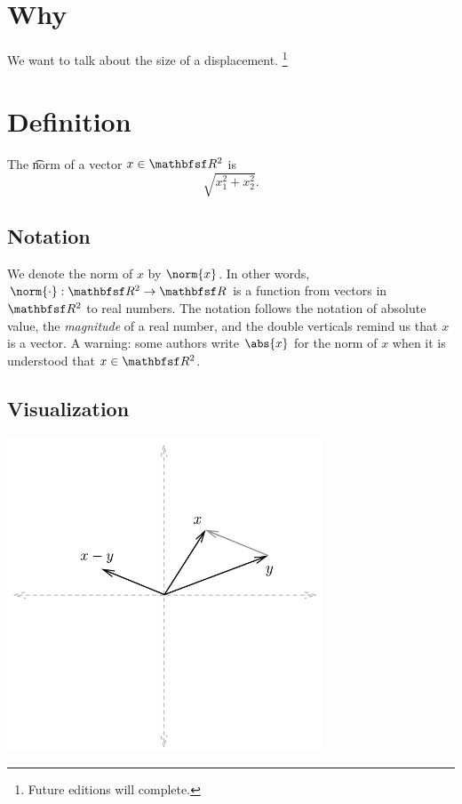
\section*{Why}

We want to talk about the size of a displacement.
  \ifhmode\unskip\fi\footnote{
Future editions will complete.
  }

\section*{Definition}

The \t{norm} of a vector $x \in \R ^2$ is
  \[
\sqrt{x_1^2 + x_2^2}.
  \]

\subsection*{Notation}

We denote the norm of $x$ by $\norm{x}$.
In other words, $\norm{\cdot}: \R ^2 \to \R $ is a function from vectors in $\R ^2$ to real numbers.
The notation follows the notation of absolute value, the \textit{magnitude} of a real number, and the double verticals remind us that $x$ is a vector.
A warning: some authors write $\abs{x}$ for the norm of $x$ when it is understood that $x \in \R ^2$.

\subsection*{Visualization}

\begin{center}\includegraphics[width=0.70\textwidth]{./graphics/x-y.pdf}\end{center}
\blankpage